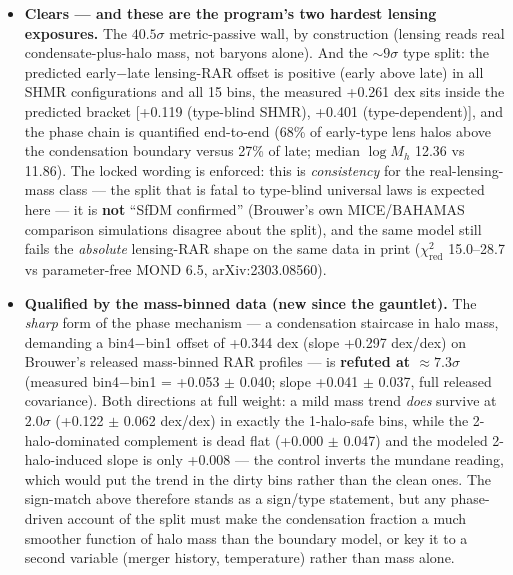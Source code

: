 \documentclass[11pt,a4paper]{article}
\begin{document}
\begin{itemize}
\item \textbf{Clears --- and these are the program's two hardest lensing exposures.} The $40.5\sigma$ metric-passive wall, by construction (lensing reads real condensate-plus-halo mass, not baryons alone). And the $\sim{}9\sigma$ type split: the predicted early$-$late lensing-RAR offset is positive (early above late) in all SHMR configurations and all 15 bins, the measured +0.261 dex sits inside the predicted bracket [+0.119 (type-blind SHMR), +0.401 (type-dependent)], and the phase chain is quantified end-to-end (68\% of early-type lens halos above the condensation boundary versus 27\% of late; median $\log M_h$ 12.36 vs 11.86). The locked wording is enforced: this is \emph{consistency} for the real-lensing-mass class --- the split that is fatal to type-blind universal laws is expected here --- it is \textbf{not} ``SfDM confirmed'' (Brouwer's own MICE/BAHAMAS comparison simulations disagree about the split), and the same model still fails the \emph{absolute} lensing-RAR shape on the same data in print ($\chi^2_{\mathrm{red}}$ 15.0--28.7 vs parameter-free MOND 6.5, arXiv:2303.08560).

\item \textbf{Qualified by the mass-binned data (new since the gauntlet).} The \emph{sharp} form of the phase mechanism --- a condensation staircase in halo mass, demanding a bin4$-$bin1 offset of +0.344 dex (slope +0.297 dex/dex) on Brouwer's released mass-binned RAR profiles --- is \textbf{refuted at $\approx{}7.3\sigma$} (measured bin4$-$bin1 = +0.053 $\pm$ 0.040; slope +0.041 $\pm$ 0.037, full released covariance). Both directions at full weight: a mild mass trend \emph{does} survive at $2.0\sigma$ (+0.122 $\pm$ 0.062 dex/dex) in exactly the 1-halo-safe bins, while the 2-halo-dominated complement is dead flat (+0.000 $\pm$ 0.047) and the modeled 2-halo-induced slope is only +0.008 --- the control inverts the mundane reading, which would put the trend in the dirty bins rather than the clean ones. The sign-match above therefore stands as a sign/type statement, but any phase-driven account of the split must make the condensation fraction a much smoother function of halo mass than the boundary model, or key it to a second variable (merger history, temperature) rather than mass alone.


\end{itemize}
\end{document}
